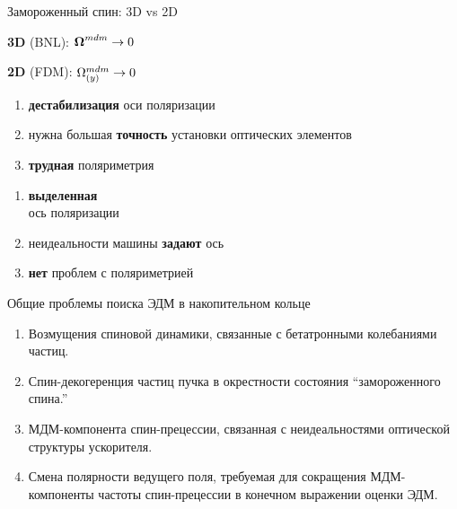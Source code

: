 \documentclass[14pt]{beamer}
\newcommand{\Wmdm}{\W^{mdm}}
\begin{document}
\begin{frame}{Замороженный спин: 3D vs 2D}
	\begin{minipage}[t]{.5\linewidth}
		\textbf{3D} (BNL): $\vec\Wmdm\to0$
	\end{minipage}%
	\begin{minipage}[t]{.5\linewidth}
		\textbf{2D} (FDM): $\Wmdm_{(y)}\to0$
	\end{minipage}
	\begin{minipage}[t]{.5\linewidth}
		\begin{enumerate}
			\item \textbf{дестабилизация} оси поляризации
			\item нужна большая \textbf{точность} установки оптических элементов
			\item \textbf{трудная} поляриметрия
		\end{enumerate}
	\end{minipage}%
	\begin{minipage}[t]{.5\linewidth}
		\begin{enumerate}
			\item \textbf{выделенная}\\ось поляризации
			\item неидеальности машины \textbf{задают} ось
			\item \textbf{нет} проблем с поляриметрией
		\end{enumerate}
	\end{minipage}
%		
%		
\end{frame}
\begin{frame}{Общие проблемы поиска ЭДМ в накопительном кольце}
	\begin{enumerate}
		\item Возмущения спиновой динамики, связанные с бетатронными колебаниями частиц.
		\item Спин-декогеренция частиц пучка в окрестности состояния ``замороженного спина.''
		\item МДМ-компонента спин-прецессии, связанная с неидеальностями оптической структуры ускорителя.
		\item Смена полярности ведущего поля, требуемая для сокращения МДМ-компоненты частоты спин-прецессии в конечном выражении оценки ЭДМ.
	\end{enumerate}
\end{frame}
\end{document}
